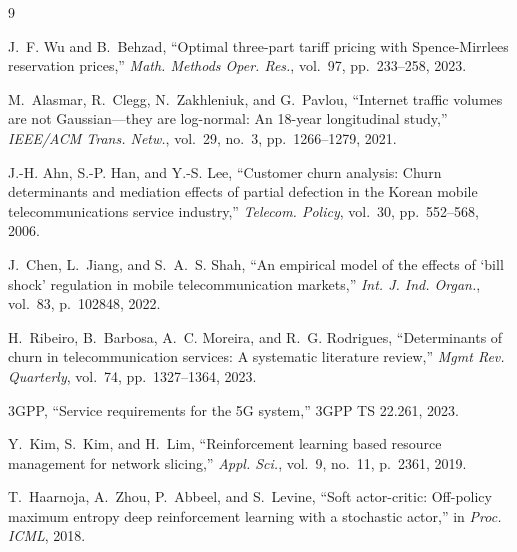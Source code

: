 \documentclass[10pt, twocolumn]{article}
\begin{document}
\begin{thebibliography}{9}

J.~F. Wu and B.~Behzad,
``Optimal three-part tariff pricing with Spence-Mirrlees reservation prices,''
\textit{Math. Methods Oper. Res.}, vol.~97, pp.~233--258, 2023.

M.~Alasmar, R.~Clegg, N.~Zakhleniuk, and G.~Pavlou,
``Internet traffic volumes are not Gaussian---they are log-normal: An 18-year longitudinal study,''
\textit{IEEE/ACM Trans. Netw.}, vol.~29, no.~3, pp.~1266--1279, 2021.

J.-H. Ahn, S.-P. Han, and Y.-S. Lee,
``Customer churn analysis: Churn determinants and mediation effects of partial defection in the Korean mobile telecommunications service industry,''
\textit{Telecom. Policy}, vol.~30, pp.~552--568, 2006.

J.~Chen, L.~Jiang, and S.~A.~S. Shah,
``An empirical model of the effects of `bill shock' regulation in mobile telecommunication markets,''
\textit{Int. J. Ind. Organ.}, vol.~83, p.~102848, 2022.

H.~Ribeiro, B.~Barbosa, A.~C. Moreira, and R.~G. Rodrigues,
``Determinants of churn in telecommunication services: A systematic literature review,''
\textit{Mgmt Rev. Quarterly}, vol.~74, pp.~1327--1364, 2023.

3GPP,
``Service requirements for the 5G system,''
3GPP TS 22.261, 2023.

Y.~Kim, S.~Kim, and H.~Lim,
``Reinforcement learning based resource management for network slicing,''
\textit{Appl. Sci.}, vol.~9, no.~11, p.~2361, 2019.

T.~Haarnoja, A.~Zhou, P.~Abbeel, and S.~Levine,
``Soft actor-critic: Off-policy maximum entropy deep reinforcement learning with a stochastic actor,''
in \textit{Proc. ICML}, 2018.

\end{thebibliography}
\end{document}
